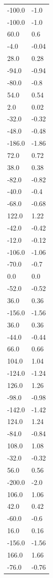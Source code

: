 \begin{longtable}{ll}
-100.0 & -1.0 \\
-100.0 & -1.0 \\
60.0 & 0.6 \\
-4.0 & -0.04 \\
28.0 & 0.28 \\
-94.0 & -0.94 \\
-80.0 & -0.8 \\
54.0 & 0.54 \\
2.0 & 0.02 \\
-32.0 & -0.32 \\
-48.0 & -0.48 \\
-186.0 & -1.86 \\
72.0 & 0.72 \\
38.0 & 0.38 \\
-82.0 & -0.82 \\
-40.0 & -0.4 \\
-68.0 & -0.68 \\
122.0 & 1.22 \\
-42.0 & -0.42 \\
-12.0 & -0.12 \\
-106.0 & -1.06 \\
-70.0 & -0.7 \\
0.0 & 0.0 \\
-52.0 & -0.52 \\
36.0 & 0.36 \\
-156.0 & -1.56 \\
36.0 & 0.36 \\
-44.0 & -0.44 \\
66.0 & 0.66 \\
104.0 & 1.04 \\
-124.0 & -1.24 \\
126.0 & 1.26 \\
-98.0 & -0.98 \\
-142.0 & -1.42 \\
124.0 & 1.24 \\
-84.0 & -0.84 \\
108.0 & 1.08 \\
-32.0 & -0.32 \\
56.0 & 0.56 \\
-200.0 & -2.0 \\
106.0 & 1.06 \\
42.0 & 0.42 \\
-60.0 & -0.6 \\
16.0 & 0.16 \\
-156.0 & -1.56 \\
166.0 & 1.66 \\
-76.0 & -0.76 \\

\end{longtable}
